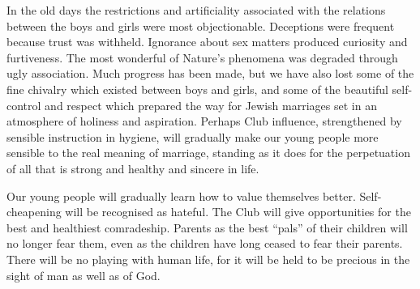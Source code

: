 In the old days the restrictions and artificiality associated
with the relations between the boys and girls were
most objectionable. Deceptions were frequent because
trust was withheld. Ignorance about sex matters produced
curiosity and furtiveness. The most wonderful of Nature’s
phenomena was degraded through ugly association.
Much progress has been made, but we have also lost some
of the fine chivalry which existed between boys and girls,
and some of the beautiful self-control and respect which
prepared the way for Jewish marriages set in an
atmosphere of holiness and aspiration. Perhaps Club
influence, strengthened by sensible instruction in hygiene,
will gradually make our young people more sensible to the
real meaning of marriage, standing as it does for the perpetuation
of all that is strong and healthy and sincere in life.

Our young people will gradually learn how to value
themselves better. Self-cheapening will be recognised as
hateful. The Club will give opportunities for the best and
healthiest comradeship. Parents as the best “pals” of
their children will no longer fear them, even as the children
have long ceased to fear their parents. There will be
no playing with human life, for it will be held to be
precious in the sight of man as well as of God.


